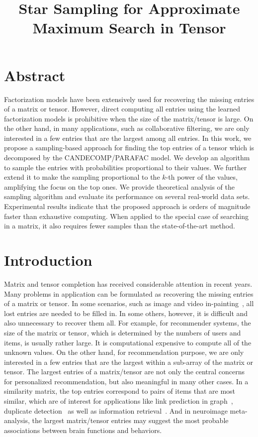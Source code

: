 \documentclass[letterpaper]{article}
\title{Star Sampling for Approximate Maximum Search in Tensor}
\begin{document}
\maketitle
\section{Abstract}
Factorization models have been extensively used for 
recovering the missing entries of a matrix or tensor. 
However, direct computing all entries 
using the learned factorization models is prohibitive 
when the size of the matrix/tensor is large. 
On the other hand, in many applications, 
such as collaborative filtering, 
we are only interested in a few entries that are the largest among all entries. 
In this work, we propose a sampling-based approach for finding the top entries of a tensor 
which is decomposed by the CANDECOMP/PARAFAC model. 
We develop an algorithm to sample the entries with probabilities proportional to their values. 
We further extend it to make the sampling proportional to the $k$-th power of the values, 
amplifying the focus on the top ones. 
We provide theoretical analysis of the sampling algorithm and evaluate its performance on several real-world data sets. 
Experimental results indicate that the proposed approach is orders of magnitude faster than exhaustive computing. 
When applied to the special case of searching in a matrix, 
it also requires fewer samples than the state-of-the-art method.

\section{Introduction}
Matrix and tensor completion has received considerable attention in recent years. 
Many problems in application can be formulated 
as recovering the missing entries of a matrix or tensor. 
In some scenarios, such as image and video in-painting~\cite{Ankita14}, 
all lost entries are needed to be filled in. 
In some others, however, it is difficult and also unnecessary to recover them all. 
For example, for recommender systems, the size of the matrix or tensor, 
which is determined by the numbers of users and items, is usually rather large. 
It is computational expensive to compute all of the unknown values. 
On the other hand, for recommendation purpose, 
we are only interested in a few entries that are the largest within a sub-array of the matrix or tensor. 
The largest entries of a matrix/tensor are not only the central concerns for personalized recommendation, 
but also meaningful in many other cases. 
In a similarity matrix, the top entries correspond to pairs of items that are most similar, 
which are of interest for applications like link prediction in graph~\cite{LibenNowell07}, 
duplicate detection~\cite{Ke2010} as well as information retrieval~\cite{Salton03IR}. 
And in neuroimage meta-analysis, 
the largest matrix/tensor entries may suggest the most probable associations between brain functions and behaviors.
\end{document}
